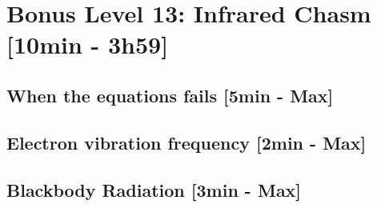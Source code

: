 
\section{Bonus Level 13: Infrared Chasm [10min  - 3h59]}
\subsection{When the equations fails [5min - Max]}
\subsection{Electron vibration frequency [2min - Max]}
\subsection{Blackbody Radiation [3min - Max]}

